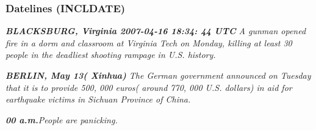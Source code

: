 \documentclass[table]{beamer}
\begin{document}




\begin{frame}
  \frametitle{Datelines (INCLDATE)}
  \textit{\textbf{BLACKSBURG, Virginia 2007-04-16 18:34: 44 UTC} A gunman opened fire in a dorm and classroom at Virginia Tech on Monday, killing at least 30 people in the deadliest shooting rampage in U.S. history.}
  \vspace{0.5cm}

  \textit{\textbf{BERLIN, May 13( Xinhua)} The German government announced on Tuesday that it is to provide 500, 000 euros( around 770, 000 U.S. dollars) in aid for earthquake victims in Sichuan Province of China.}
  \vspace{0.5cm}

  \textit{\textbf{00 a.m.}People are panicking.}
\end{frame}
\end{document}
